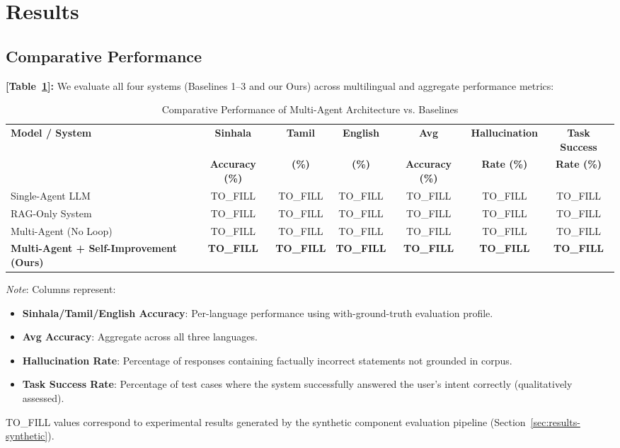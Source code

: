 \documentclass[11pt,a4paper]{article}
\begin{document}
\section{Results}

\subsection{Comparative Performance}
\label{sec:results-comparative}

\textbf{[Table~\ref{tab:comparative-results}]:} We evaluate all four systems (Baselines 1--3 and our Ours) across multilingual and aggregate performance metrics:

\begin{table}[H]
\centering
\caption{Comparative Performance of Multi-Agent Architecture vs. Baselines}
\label{tab:comparative-results}
\begin{tabular}{l|ccc|ccc}
\toprule
\textbf{Model / System} & \textbf{Sinhala} & \textbf{Tamil} & \textbf{English} & \textbf{Avg} & \textbf{Hallucination} & \textbf{Task Success} \\
& \textbf{Accuracy (\%)} & \textbf{(\%)} & \textbf{(\%)} & \textbf{Accuracy (\%)} & \textbf{Rate (\%)} & \textbf{Rate (\%)} \\
\midrule
Single-Agent LLM & TO\_FILL & TO\_FILL & TO\_FILL & TO\_FILL & TO\_FILL & TO\_FILL \\
\midrule
RAG-Only System & TO\_FILL & TO\_FILL & TO\_FILL & TO\_FILL & TO\_FILL & TO\_FILL \\
\midrule
Multi-Agent (No Loop) & TO\_FILL & TO\_FILL & TO\_FILL & TO\_FILL & TO\_FILL & TO\_FILL \\
\midrule
\textbf{Multi-Agent + Self-Improvement (Ours)} & \textbf{TO\_FILL} & \textbf{TO\_FILL} & \textbf{TO\_FILL} & \textbf{TO\_FILL} & \textbf{TO\_FILL} & \textbf{TO\_FILL} \\
\bottomrule
\end{tabular}

\textit{Note}: Columns represent:
\begin{itemize}
    \item \textbf{Sinhala/Tamil/English Accuracy}: Per-language performance using with-ground-truth evaluation profile.
    \item \textbf{Avg Accuracy}: Aggregate across all three languages.
    \item \textbf{Hallucination Rate}: Percentage of responses containing factually incorrect statements not grounded in corpus.
    \item \textbf{Task Success Rate}: Percentage of test cases where the system successfully answered the user's intent correctly (qualitatively assessed).
\end{itemize}

TO\_FILL values correspond to experimental results generated by the synthetic component evaluation pipeline (Section~\ref{sec:results-synthetic}).

\end{table}
\end{document}
